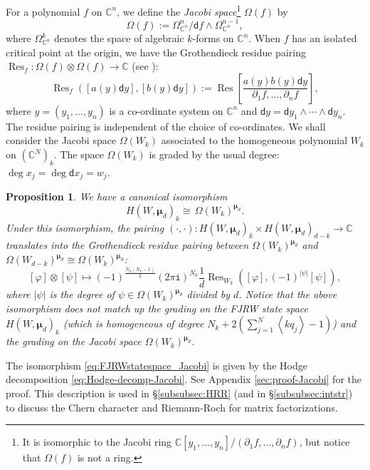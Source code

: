 \documentclass[11pt]{amsart}
\newtheorem{pro}[thm]{Proposition} %
\theoremstyle{definition} %
\theoremstyle{remark} %
\newcommand{\CC}{\mathbb C}
\newcommand{\Res}{\operatorname{Res}}
\def\fracp#1{\left\langle #1 \right\rangle}
\newcommand{\bmu}{\boldsymbol{\mu}}
\newcommand{\dd}{\mathsf{d}}
\newcommand{\iu}{\mathtt{i}}
\begin{document}
For a polynomial $f$ on $\CC^n$, we define the 
\emph{Jacobi space}\footnote
{It is isomorphic to the Jacobi ring $\CC[y_1,\dots,y_n]/
(\partial_1 f, \dots, \partial_n f)$, 
but notice that $\Omega(f)$ is not a ring.} 
$\Omega(f)$ by 
\begin{equation} 
\label{eq:Jacobiring} 
\Omega(f) := 
\Omega^{n}_{\CC^n} \big/ \dd f \wedge \Omega^{n-1}_{\CC^n}, 
\end{equation} 
where $\Omega^k_{\CC^n}$ denotes the space of algebraic  
$k$-forms on $\CC^n$. 
When $f$ has an isolated critical point at the origin, we 
have the Grothendieck residue pairing $\Res_{f} 
\colon \Omega(f) \otimes \Omega(f) \to 
\CC$ (see \cite{Griffiths-Harris}): 
\[
\Res_{f}\left( [a(y) \dd y], 
[b(y) \dd y] \right) 
:= \Res \left[ 
\frac{a(y) b(y) \dd y}{\partial_1 f, \dots,\partial_n f}
\right],  
\]
where $y=(y_1,\dots,y_n)$ is a co-ordinate system on $\CC^n$ and 
$\dd y = \dd y_1\wedge \cdots \wedge \dd y_n$. 
The residue pairing is independent 
of the choice of co-ordinates. 
We shall consider the Jacobi space $\Omega(W_k)$ 
associated to the homogeneous 
polynomial $W_k$ on $(\CC^N)_k$. 
The space $\Omega(W_k)$ is graded by the usual degree:  
$\deg x_j = \deg \dd x_j = w_j$. 
\begin{pro} 
\label{pro:FJRWstatespace_Jacobi} 
We have a canonical isomorphism 
\begin{equation} 
\label{eq:FJRWstatespace_Jacobi}
H(W,\bmu_d)_k \cong \, \Omega(W_k)^{\bmu_d}.  
\end{equation} 
Under this isomorphism, the pairing $(\cdot,\cdot) \colon 
H(W,\bmu_d)_k\times H(W,\bmu_d)_{d-k} \to \CC$ 
translates into the Grothendieck residue pairing 
between $\Omega(W_k)^{\bmu_d}$ and $\Omega(W_{d-k})^{\bmu_d} 
\cong \Omega(W_k)^{\bmu_d}$:  
\[
[\varphi] \otimes [\psi] \longmapsto  
(-1)^{\frac{N_k(N_k-1)}{2}} 
(2\pi\iu)^{N_k} \frac{1}{d}  
\Res_{W_k}\left( [\varphi], (-1)^{|\psi|} [\psi] \right), 
\]
where $|\psi|$ is the degree of $\psi\in \Omega(W_k)^{\bmu_d}$ 
divided by $d$. %
Notice that the above isomorphism does not match up the grading 
on the FJRW state space $H(W,\bmu_d)_k$ (which is homogeneous 
of degree $N_k + 2 (\sum_{j=1}^N \fracp{kq_j} -1)$)  
and the grading on the Jacobi space $\Omega(W_k)^{\bmu_d}$. 
\end{pro} 
The isomorphism \eqref{eq:FJRWstatespace_Jacobi} 
is given by the Hodge decomposition \eqref{eq:Hodge-decomp-Jacobi}. 
See Appendix \ref{sec:proof-Jacobi} for the proof. 
This description is used in \S \ref{subsubsec:HRR} 
(and in \S \ref{subsubsec:intstr})  
to discuss the Chern character and 
Riemann-Roch for matrix factorizations. 
\end{document}
